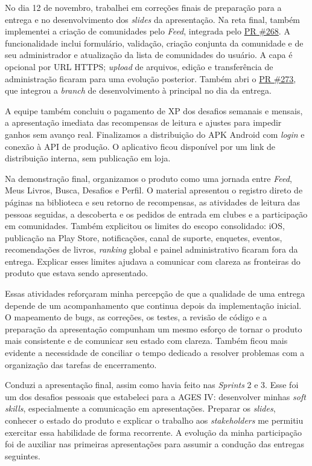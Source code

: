 No dia 12 de novembro, trabalhei em correções finais de preparação para a entrega e no desenvolvimento dos \textit{slides} da apresentação. Na reta final, também implementei a criação de comunidades pelo \textit{Feed}, integrada pelo \href{https://github.com/ReadRace-AGES/ReadRace/pull/268}{PR \#268}. A funcionalidade inclui formulário, validação, criação conjunta da comunidade e de seu administrador e atualização da lista de comunidades do usuário. A capa é opcional por \ac{URL} \ac{HTTPS}; \textit{upload} de arquivos, edição e transferência de administração ficaram para uma evolução posterior. Também abri o \href{https://github.com/ReadRace-AGES/ReadRace/pull/273}{PR \#273}, que integrou a \textit{branch} de desenvolvimento à principal no dia da entrega.

A equipe também concluiu o pagamento de \ac{XP} dos desafios semanais e mensais, a apresentação imediata das recompensas de leitura e ajustes para impedir ganhos sem avanço real. Finalizamos a distribuição do \ac{APK} Android com \textit{login} e conexão à \ac{API} de produção. O aplicativo ficou disponível por um link de distribuição interna, sem publicação em loja.

Na demonstração final, organizamos o produto como uma jornada entre \textit{Feed}, Meus Livros, Busca, Desafios e Perfil. O material apresentou o registro direto de páginas na biblioteca e seu retorno de recompensas, as atividades de leitura das pessoas seguidas, a descoberta e os pedidos de entrada em clubes e a participação em comunidades. Também explicitou os limites do escopo consolidado: iOS, publicação na Play Store, notificações, canal de suporte, enquetes, eventos, recomendações de livros, \textit{ranking} global e painel administrativo ficaram fora da entrega. Explicar esses limites ajudava a comunicar com clareza as fronteiras do produto que estava sendo apresentado.

Essas atividades reforçaram minha percepção de que a qualidade de uma entrega depende de um acompanhamento que continua depois da implementação inicial. O mapeamento de bugs, as correções, os testes, a revisão de código e a preparação da apresentação compunham um mesmo esforço de tornar o produto mais consistente e de comunicar seu estado com clareza. Também ficou mais evidente a necessidade de conciliar o tempo dedicado a resolver problemas com a organização das tarefas de encerramento.

Conduzi a apresentação final, assim como havia feito nas \textit{Sprints} 2 e 3. Esse foi um dos desafios pessoais que estabeleci para a \ac{AGES} IV: desenvolver minhas \textit{soft skills}, especialmente a comunicação em apresentações. Preparar os \textit{slides}, conhecer o estado do produto e explicar o trabalho aos \textit{stakeholders} me permitiu exercitar essa habilidade de forma recorrente. A evolução da minha participação foi de auxiliar nas primeiras apresentações para assumir a condução das entregas seguintes.

